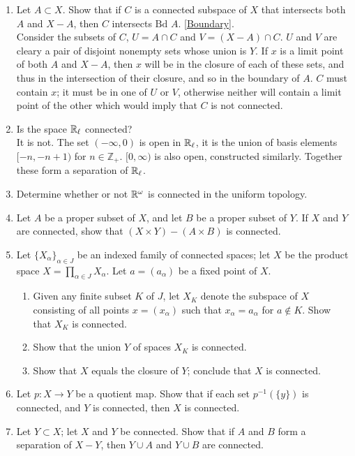 \documentclass[12pt,letterpaper]{article}
\begin{document}
\begin{enumerate}
  \item Let $A\subset X$. Show that if $C$ is a connected subspace of $X$ that intersects both $A$ and $X-A$, then $C$ intersects $\text{Bd } A$. [\hyperref[dfn:boundary]{Boundary}].\\
  Consider the subsets of $C$, $U=A\cap C$ and $V=(X-A)\cap C$. $U$ and $V$ are cleary a pair of disjoint nonempty sets whose union is $Y$. If $x$ is a limit point of both $A$ and $X-A$, then $x$ will be in the closure of each of these sets, and thus in the intersection of their closure, and so in the boundary of $A$. $C$ must contain $x$; it must be in one of $U$ or $V$, otherwise neither will contain a limit point of the other which would imply that $C$ is not connected.
  \item Is the space \hyperref[dfn:lowerLimitTopology]{$\mathbb{R}_\ell$} connected? \\
  It is not. The set $(-\infty,0)$ is open in $\mathbb{R}_\ell$, it is the union of basis elements $[-n,-n+1)$ for $n\in\mathbb{Z}_+$. $[0,\infty)$ is also open, constructed similarly. Together these form a separation of $\mathbb{R}_\ell$.
  \item Determine whether or not $\mathbb{R}^\omega$ is connected in the uniform topology. \\
  \item Let $A$ be a proper subset of $X$, and let $B$ be a proper subset of $Y$. If $X$ and $Y$ are connected, show that $(X\times Y) - (A\times B)$ is connected.
  \item Let $\{X_\alpha\}_{\alpha\in J}$ be an indexed family of connected spaces; let $X$ be the product space $X=\prod_{\alpha\in J}X_\alpha$. Let $a=(a_\alpha)$ be a fixed point of $X$.
  \begin{enumerate}
    \item Given any finite subset $K$ of $J$, let $X_K$ denote the subspace of $X$ consisting of all points $x=(x_\alpha)$ such that $x_\alpha=a_\alpha$ for $a\not\in K$. Show that $X_K$ is connected.
    \item Show that the union $Y$ of spaces $X_K$ is connected.
    \item Show that $X$ equals the closure of $Y$; conclude that $X$ is connected.
  \end{enumerate}
  \item Let $p:X\rightarrow Y$ be a quotient map. Show that if each set $p^{-1}(\{y\})$ is connected, and $Y$ is connected, then $X$ is connected.
  \item Let $Y\subset X$; let $X$ and $Y$ be connected. Show that if $A$ and $B$ form a separation of $X-Y$, then $Y\cup A$ and $Y\cup B$ are connected.
\end{enumerate}
\end{document}
